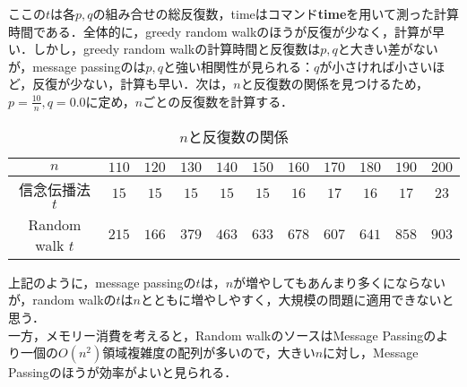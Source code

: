 \documentclass[a4paper,11pt]{jsarticle}
\numberwithin{theorem}{section}  %
\numberwithin{equation}{section} %
\begin{document}
ここの$t$は各$p,q$の組み合せの総反復数，timeはコマンド{\bf time}を用いて測った計算時間である．全体的に，greedy random walkのほうが反復が少なく，計算が早い．しかし，greedy random walkの計算時間と反復数は$p,q$と大きい差がないが，message passingのは$p,q$と強い相関性が見られる：$q$が小さければ小さいほど，反復が少ない，計算も早い．次は，$n$と反復数の関係を見つけるため，$p=\frac{10}{n},q=0.0$に定め，$n$ごとの反復数を計算する．
\begin{table}[htdp]
\caption{$n$と反復数の関係}
\begin{center}
\begin{tabular}{|c|c|c|c|c|c|c|c|c|c|c|}
\hline
$n$ & $110$& $120$& $130$& $140$& $150$& $160$& $170$& $180$& $190$& $200$\\
\hline
信念伝播法 $t$ & $15$& $15$& $15$& $15$& $15$& $16$& $17$& $16$& $17$& $23$\\
\hline
Random walk $t$ & $215$& $166$& $379$& $463$& $633$& $678$& $607$& $641$& $858$& $903$\\
\hline
\end{tabular}
\end{center}
\label{default}
\end{table}
上記のように，message passingの$t$は，$n$が増やしてもあんまり多くにならないが，random walkの$t$は$n$とともに増やしやすく，大規模の問題に適用できないと思う．\\
一方，メモリー消費を考えると，Random walkのソースはMessage Passingのより一個の$O(n^2)$領域複雑度の配列が多いので，大きい$n$に対し，Message Passingのほうが効率がよいと見られる．
\end{document}
